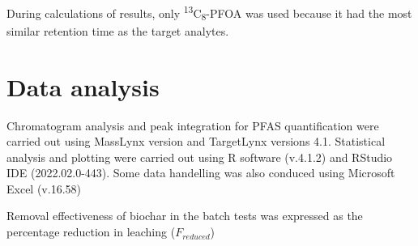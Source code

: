 During calculations of results, only \textsuperscript{13}C\textsubscript{8}-PFOA was used because it had the most similar retention time as the target analytes. 





\section{Data analysis}
Chromatogram analysis and peak integration for PFAS quantification were carried out using MassLynx version and TargetLynx versions 4.1. Statistical analysis and plotting were carried out using R software (v.4.1.2) and RStudio IDE (2022.02.0-443). Some data handelling was also conduced using Microsoft Excel (v.16.58) 

Removal effectiveness of biochar in the batch tests was expressed as the percentage reduction in leaching ($F_{reduced}$) 

